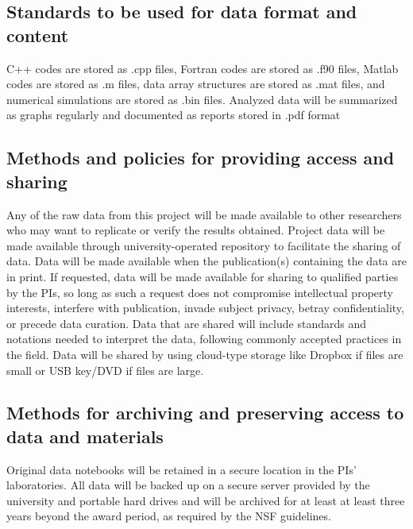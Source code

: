 \documentclass[11pt]{article}
\begin{document}
\subsection*{Standards to be used for data format and content}
C++ codes are stored as .cpp files, Fortran codes are stored as .f90
files, Matlab codes are stored as .m files, data array structures are
stored as .mat files, and numerical simulations are stored as .bin
files. Analyzed data will be summarized as graphs regularly and
documented as reports stored in .pdf format 

\subsection*{Methods and policies for providing access and sharing}
Any of the raw data from this project will be made available to other
researchers who may want to replicate or verify the results obtained.
Project data will be made available through university-operated
repository to facilitate the sharing of data. Data will be made
available when the publication(s) containing the data are in print. If
requested, data will be made available for sharing to qualified parties
by the PIs, so long as such a request does not compromise intellectual
property interests, interfere with publication, invade subject privacy,
betray confidentiality, or precede data curation. Data that are shared
will include standards and notations needed to interpret the data,
following commonly accepted practices in the field. Data will be shared
by using cloud-type storage like Dropbox if files are small or USB
key/DVD if files are large. 

\subsection*{Methods for archiving and preserving access to data and
materials}
Original data notebooks will be retained in a secure location in the
PIs' laboratories. All data will be backed up on a secure server
provided by the university and portable hard drives and will be archived
for at least at least three years beyond the award period, as required
by the NSF guidelines.
\end{document}
